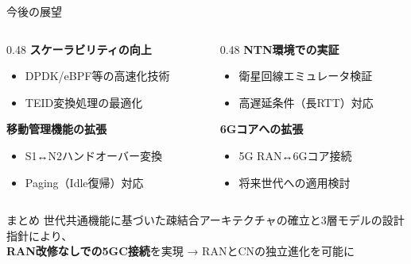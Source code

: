 \documentclass[dvipdfmx,11pt,aspectratio=169]{beamer}
\begin{document}
\begin{frame}{今後の展望}
  \begin{columns}[T]
    \begin{column}{0.48\textwidth}
      \textbf{スケーラビリティの向上}
      \begin{itemize}
        \item DPDK/eBPF等の高速化技術
        \item TEID変換処理の最適化
      \end{itemize}

      \vspace{0.3cm}
      \textbf{移動管理機能の拡張}
      \begin{itemize}
        \item S1↔N2ハンドオーバー変換
        \item Paging（Idle復帰）対応
      \end{itemize}
    \end{column}
    \begin{column}{0.48\textwidth}
      \textbf{NTN環境での実証}
      \begin{itemize}
        \item 衛星回線エミュレータ検証
        \item 高遅延条件（長RTT）対応
      \end{itemize}

      \vspace{0.3cm}
      \textbf{6Gコアへの拡張}
      \begin{itemize}
        \item 5G RAN↔6Gコア接続
        \item 将来世代への適用検討
      \end{itemize}
    \end{column}
  \end{columns}

  \vspace{0.5cm}
  \begin{alertblock}{まとめ}
    \centering
    世代共通機能に基づいた疎結合アーキテクチャの確立と3層モデルの設計指針により、\\
    \textbf{RAN改修なしでの5GC接続}を実現 → RANとCNの独立進化を可能に
  \end{alertblock}
\end{frame}
\end{document}
